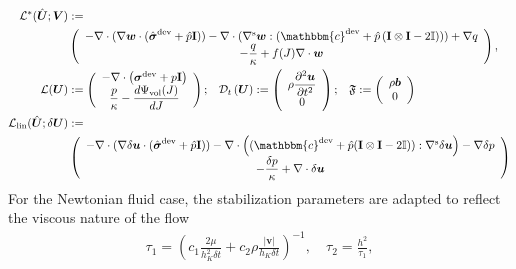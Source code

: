 \documentclass[11pt,english]{article}
\def\disp{\boldsymbol{u}}
\def\disptest{\boldsymbol{w}}
\def\stress{\boldsymbol{\sigma}}
\def\Identity{\mathbf{I}}
\def\TestFunctions{\boldsymbol{V}}
\def\UnkVariables{\boldsymbol{U}}
\def\VolPsi{\Psi_{\rm{vol}}}
\def\DerL{\mathcal{L}_{\text{lin}}}
\def\temp{\dfrac{\partial^2 \disp}{\partial t^2}}
\begin{document}
    \begin{align*}
        \mathcal{L}^*(\hat{\UnkVariables};\TestFunctions)&:=\\
        &\left(\begin{array}{c}
         -\nabla \cdot (\nabla \disptest \cdot( \hat{\stress}^{\text{dev}}+\hat{p}\Identity ))-\nabla \cdot (\nabla^{\rm{s}} \disptest: (\mathbbm{c}^{\text{dev}}+\hat{p}\left( \Identity \otimes \Identity -2\mathbb{I}))\right) + \nabla q
         \\
        - \dfrac{q}{\kappa} + f(J) \nabla \cdot \disptest 
        \end{array}\right),\\
        \mathcal{L}(\UnkVariables)&:=\left(\begin{array}{c}
            - \nabla  \cdot \left(\stress^{\text{dev}}+p\Identity\right)\\
            \dfrac{p}{\kappa}- \dfrac{d\VolPsi(J)}{dJ} \\
            \end{array}\right)\label{eq:L_operator}\text{;} \quad
            \mathcal{D}_t\left(\UnkVariables\right):=\left(\begin{array}{c}
            \rho \temp\\
            {0}
            \end{array}\right) \text{;} \quad \mathfrak{F}:=\left(\begin{array}{c}
            \rho \boldsymbol{b}\\
            {0}
            \end{array}\right) \\
        \DerL(\hat{\UnkVariables};\delta\UnkVariables)&:=\nonumber\\
        &\left(\begin{array}{c}
        -\nabla \cdot (\nabla \delta \disp \cdot ( \hat{\stress}^{\text{dev}}+\hat{p}\Identity ))-\nabla \cdot \left( (\mathbbm{c}^{\text{dev}}+\hat{p}(\Identity \otimes \Identity -2\mathbb{I})):\nabla^{\rm{s}} \delta \disp\right) - \nabla \delta p \\
         -\dfrac{\delta p}{\kappa}+\nabla \cdot \delta \disp
        \end{array}\right)
    \end{align*}
    For the Newtonian fluid case, the stabilization parameters are adapted to reflect the viscous nature of the flow \cite{codina2000stabilization}
    \begin{align}
        \tau_1 = \left(c_1 \frac{2\mu}{h_K^2\delta t} + c_2\rho\frac{|\boldsymbol{v}|}{h_K \delta t}\right)^{-1}, \quad
        \tau_2 = \frac{h^2}{\tau_1},
    \end{align}
\end{document}
